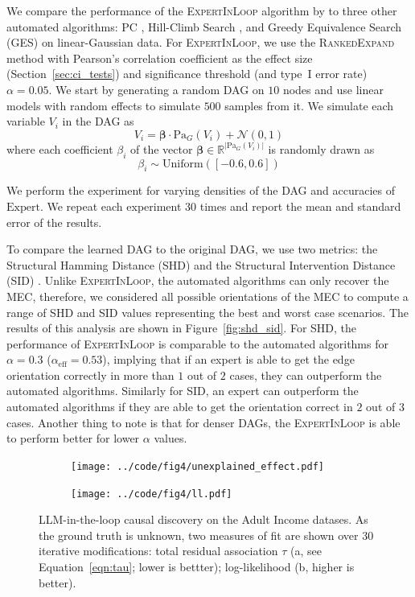 \documentclass[accepted]{uai2025} %
\begin{document}
We compare the performance of the \textsc{ExpertInLoop} algorithm by
to three other automated algorithms: PC \citep{Spirtes2001,KalischB07}, 
Hill-Climb Search \citep{scutari2010}, and Greedy Equivalence Search (GES) \citep{Chickering2002}
on linear-Gaussian data. For \textsc{ExpertInLoop}, we
use the \textsc{RankedExpand} method with Pearson's correlation coefficient as
the effect size (Section~\ref{sec:ci_tests}) and significance threshold
(and type~I error rate) $\alpha=0.05$. We start by generating a random DAG 
on $10$ nodes and use linear models
with random effects to simulate $ 500 $ samples from it. We simulate each
variable $ V_i $ in the DAG as
$$
	V_i = \bm{\beta} \cdot \mathrm{Pa}_G(V_i) + \mathcal{N}(0, 1)
$$
where each coefficient $\beta_i$ of the vector $\bm{\beta} \in \mathbb{R}^{|\mathrm{Pa}_G(V_i)|}$ is randomly drawn as
$$
\beta_i \sim \mathrm{Uniform}([-0.6, 0.6])
$$
 
We perform the experiment for varying densities of the DAG and accuracies of
$\mathrm{Expert}$. We repeat each experiment $ 30 $ times and report the
mean and standard error of the results.

To compare the learned DAG to the original DAG, we use two metrics: the Structural
Hamming Distance (SHD) and the Structural Intervention Distance (SID)
\citep{Peters2015}. Unlike \textsc{ExpertInLoop}, the automated algorithms can
only recover the MEC, therefore, we considered all possible orientations of the
MEC to compute a range of SHD and SID values representing the best and worst
case scenarios. The results of this analysis are shown in
Figure~\ref{fig:shd_sid}. For SHD, the performance of \textsc{ExpertInLoop} is
comparable to the automated algorithms for $ \alpha = 0.3$
($\alpha_{\textrm{eff}} = 0.53 $), implying that if an expert is able to get the
edge orientation correctly in more than $ 1 $ out of $ 2 $ cases, they can
outperform the automated algorithms. Similarly for SID, an expert can outperform 
the automated algorithms if they are able to get the orientation correct in $ 2 $ 
out of $ 3 $ cases. Another thing to note is that for denser DAGs, the 
\textsc{ExpertInLoop} is able to perform better for lower $ \alpha $ values.

\begin{figure}[t!]
	\begin{subfigure}{0.25\textwidth}
		\centering
		\texttt{[image: ../code/fig4/unexplained\_effect.pdf]}
		\caption{}
	\end{subfigure}%
	\begin{subfigure}{0.25\textwidth}
		\centering
		\texttt{[image: ../code/fig4/ll.pdf]}
		\caption{}
	\end{subfigure}
	\caption{LLM-in-the-loop causal discovery on the Adult Income datases. As the ground 
truth is unknown, two measures of fit are shown over 30 iterative modifications: 
total residual association $\tau$ (a, see Equation~\ref{eqn:tau}; lower is bettter); log-likelihood (b, higher is better).
	}
	\label{fig:unexplained_ll}
\end{figure}
\end{document}
